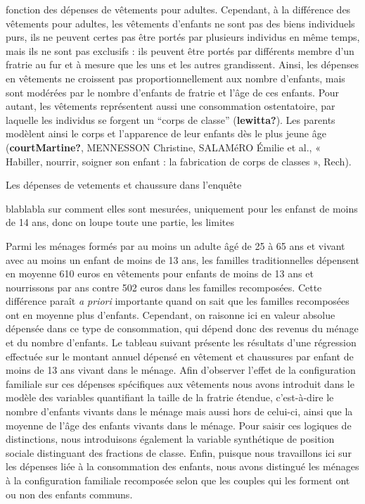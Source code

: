 \documentclass[
  12pt,
]{book}
\begin{document}
fonction des dépenses de vêtements pour adultes. Cependant, à la
différence des vêtements pour adultes, les vêtements d'enfants ne sont
pas des biens individuels purs, ils ne peuvent certes pas être portés
par plusieurs individus en même temps, mais ils ne sont pas exclusifs :
ils peuvent être portés par différents membre d'un fratrie au fur et à
mesure que les uns et les autres grandissent. Ainsi, les dépenses en
vêtements ne croissent pas proportionnellement aux nombre d'enfants,
mais sont modérées par le nombre d'enfants de fratrie et l'âge de ces
enfants. Pour autant, les vêtements représentent aussi une consommation
ostentatoire, par laquelle les individus se forgent un ``corps de
classe'' (\textbf{lewitta?}). Les parents modèlent ainsi le corps et
l'apparence de leur enfants dès le plus jeune âge
(\textbf{courtMartine?}, MENNESSON Christine, SALAMéRO Émilie et al., «
Habiller, nourrir, soigner son enfant : la fabrication de corps de
classes », Rech).

\begin{encadre}{Les dépenses de vetements et chaussure dans l'enquête}

blablabla sur comment elles sont mesurées, uniquement pour les enfanst de moins de 14 ans, donc on loupe toute une partie, les limites

\end{encadre}

Parmi les ménages formés par au moins un adulte âgé de 25 à 65 ans et
vivant avec au moins un enfant de moins de 13 ans, les familles
traditionnelles dépensent en moyenne 610 euros en vêtements pour enfants
de moins de 13 ans et nourrissons par ans contre 502 euros dans les
familles recomposées. Cette différence paraît \emph{a priori} importante
quand on sait que les familles recomposées ont en moyenne plus
d'enfants. Cependant, on raisonne ici en valeur absolue dépensée dans ce
type de consommation, qui dépend donc des revenus du ménage et du nombre
d'enfants. Le tableau suivant présente les résultats d'une régression
effectuée sur le montant annuel dépensé en vêtement et chaussures par
enfant de moins de 13 ans vivant dans le ménage. Afin d'observer l'effet
de la configuration familiale sur ces dépenses spécifiques aux vêtements
nous avons introduit dans le modèle des variables quantifiant la taille
de la fratrie étendue, c'est-à-dire le nombre d'enfants vivants dans le
ménage mais aussi hors de celui-ci, ainsi que la moyenne de l'âge des
enfants vivants dans le ménage. Pour saisir ces logiques de
distinctions, nous introduisons également la variable synthétique de
position sociale distinguant des fractions de classe. Enfin, puisque
nous travaillons ici sur les dépenses liée à la consommation des
enfants, nous avons distingué les ménages à la configuration familiale
recomposée selon que les couples qui les forment ont ou non des enfants
communs.
\end{document}
